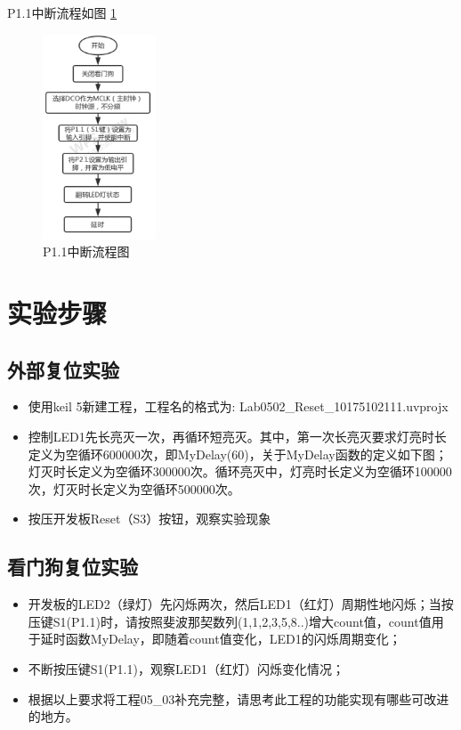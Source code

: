 \documentclass[a4paper,10pt,UTF8]{paper}
\numberwithin{equation}{section}
\numberwithin{figure}{section}
\begin{document}
P1.1中断流程如图 \ref{fig:5}

\begin{figure}[h]
  \centering
  \includegraphics[width=0.3\textwidth]{5.png}
  \caption{P1.1中断流程图}
  \label{fig:5}
\end{figure}

\section{实验步骤}

\subsection{外部复位实验}

\begin{itemize}
  \item 使用keil 5新建工程，工程名的格式为: Lab0502\_Reset\_10175102111.uvprojx
  \item 控制LED1先长亮灭一次，再循环短亮灭。其中，第一次长亮灭要求灯亮时长定义为空循环600000次，即MyDelay(60)，关于MyDelay函数的定义如下图；灯灭时长定义为空循环300000次。循环亮灭中，灯亮时长定义为空循环100000次，灯灭时长定义为空循环500000次。
  \item 按压开发板Reset（S3）按钮，观察实验现象
\end{itemize}


\subsection{看门狗复位实验}

\begin{itemize}
  \item 开发板的LED2（绿灯）先闪烁两次，然后LED1（红灯）周期性地闪烁；当按压键S1(P1.1)时，请按照斐波那契数列(1,1,2,3,5,8..)增大count值，count值用于延时函数MyDelay，即随着count值变化，LED1的闪烁周期变化；
  \item 不断按压键S1(P1.1)，观察LED1（红灯）闪烁变化情况；
  \item 根据以上要求将工程05\_03补充完整，请思考此工程的功能实现有哪些可改进的地方。
\end{itemize}
\end{document}
